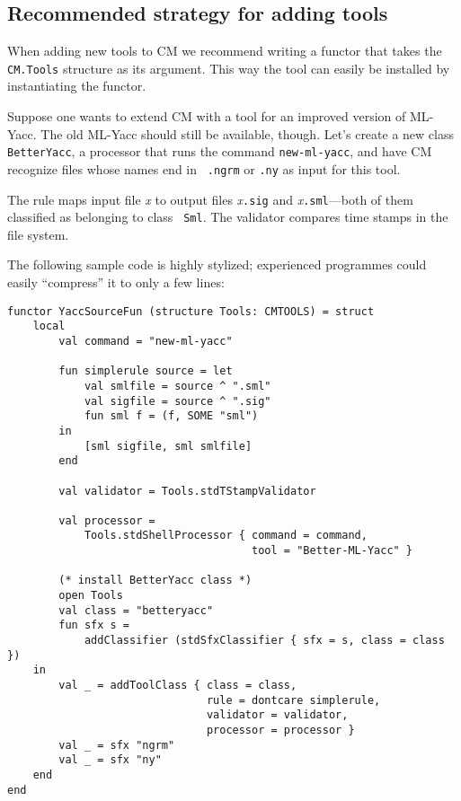 \documentclass{article}
\begin{document}
\subsection{Recommended strategy for adding tools}

When adding new tools to CM we recommend writing a functor that takes
the {\tt CM.Tools} structure as its argument.  This way the tool can
easily be installed by instantiating the functor.

Suppose one wants to extend CM with a tool for an improved version of
ML-Yacc.  The old ML-Yacc should still be available, though.  Let's
create a new class {\tt BetterYacc}, a processor that runs the command
{\tt new-ml-yacc}, and have CM recognize files whose names end in {\tt
.ngrm} or {\tt .ny} as input for this tool.

The rule maps input file {\em x} to output files {\em x}{\tt .sig} and
{\em x}{\tt .sml}---both of them classified as belonging to class {\tt
Sml}.  The validator compares time stamps in the file system.

The following sample code is highly stylized; experienced programmes
could easily ``compress'' it to only a few lines:
\begin{verbatim}
functor YaccSourceFun (structure Tools: CMTOOLS) = struct
    local
        val command = "new-ml-yacc"

        fun simplerule source = let
            val smlfile = source ^ ".sml"
            val sigfile = source ^ ".sig"
            fun sml f = (f, SOME "sml")
        in
            [sml sigfile, sml smlfile]
        end

        val validator = Tools.stdTStampValidator

        val processor =
            Tools.stdShellProcessor { command = command,
                                      tool = "Better-ML-Yacc" }

        (* install BetterYacc class *)
        open Tools
        val class = "betteryacc"
        fun sfx s =
            addClassifier (stdSfxClassifier { sfx = s, class = class })
    in
        val _ = addToolClass { class = class,
                               rule = dontcare simplerule,
                               validator = validator,
                               processor = processor }
        val _ = sfx "ngrm"
        val _ = sfx "ny"
    end
end
\end{verbatim}


\pagebreak

\appendix
\end{document}
